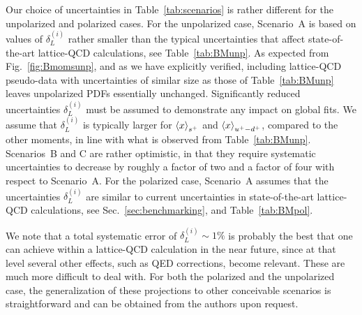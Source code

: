    
Our choice of uncertainties in Table~\ref{tab:scenarios}
is rather different for the unpolarized and polarized cases.
%
For the unpolarized case, Scenario~A is based on values
of $\delta_L^{(i)}$ rather smaller than the typical uncertainties that affect 
state-of-the-art lattice-QCD calculations, see Table~\ref{tab:BMunp}.
%
As expected from Fig.~\ref{fig:Bmomsunp}, and as we have explicitly verified,
including lattice-QCD pseudo-data with uncertainties of similar size as those 
of Table~\ref{tab:BMunp} leaves unpolarized PDFs essentially unchanged.
%
Significantly reduced uncertainties $\delta_L^{(i)}$ must be assumed to 
demonstrate any impact on global fits.
%
We assume that $\delta_L^{(i)}$ is typically larger for $\left\langle x\right\rangle_{s^+}$
and $\left\langle x\right\rangle_{u^+-d^+}$, compared to the other moments, in line with 
what is observed from Table~\ref{tab:BMunp}.
%
Scenarios~B and C are rather optimistic, in that they require systematic 
uncertainties to decrease by roughly a factor of two and a factor of four 
with respect to Scenario~A.
%    
For the polarized case, Scenario~A assumes that the uncertainties 
$\delta_L^{(i)}$ are similar to current uncertainties in
state-of-the-art lattice-QCD calculations, see Sec.~\ref{sec:benchmarking},
and Table~\ref{tab:BMpol}.

We note that a total systematic error of $\delta_L^{(i)}\sim 1\%$
is probably the best that one can achieve within a lattice-QCD calculation 
in the near future, since at that level several other effects, such as QED 
corrections, become relevant. These are much more difficult to deal with.
%
For both the polarized and the unpolarized case, the generalization of these 
projections to other conceivable scenarios
is straightforward and can be obtained from the authors upon request.
 


